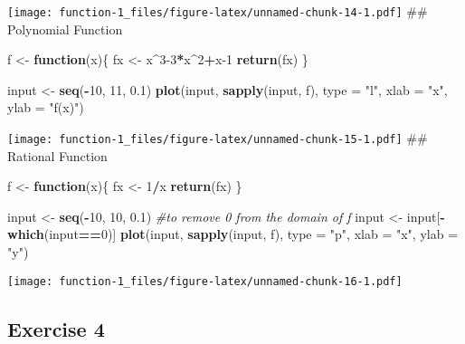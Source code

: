\documentclass[
]{article}
\newenvironment{Shaded}{\begin{snugshade}}{\end{snugshade}}
\newcommand{\CommentTok}[1]{\textcolor[rgb]{0.56,0.35,0.01}{\textit{#1}}}
\newcommand{\ControlFlowTok}[1]{\textcolor[rgb]{0.13,0.29,0.53}{\textbf{#1}}}
\newcommand{\DataTypeTok}[1]{\textcolor[rgb]{0.13,0.29,0.53}{#1}}
\newcommand{\DecValTok}[1]{\textcolor[rgb]{0.00,0.00,0.81}{#1}}
\newcommand{\FloatTok}[1]{\textcolor[rgb]{0.00,0.00,0.81}{#1}}
\newcommand{\KeywordTok}[1]{\textcolor[rgb]{0.13,0.29,0.53}{\textbf{#1}}}
\newcommand{\NormalTok}[1]{#1}
\newcommand{\OperatorTok}[1]{\textcolor[rgb]{0.81,0.36,0.00}{\textbf{#1}}}
\newcommand{\StringTok}[1]{\textcolor[rgb]{0.31,0.60,0.02}{#1}}
\begin{document}
\texttt{[image: function-1\_files/figure-latex/unnamed-chunk-14-1.pdf]}
\#\# Polynomial Function

\begin{Shaded}
\begin{Highlighting}[]
\NormalTok{f <-}\StringTok{ }\ControlFlowTok{function}\NormalTok{(x)\{}
\NormalTok{  fx <-}\StringTok{ }\NormalTok{x}\OperatorTok{^}\DecValTok{3-3}\OperatorTok{*}\NormalTok{x}\OperatorTok{^}\DecValTok{2}\OperatorTok{+}\NormalTok{x}\DecValTok{-1}
  \KeywordTok{return}\NormalTok{(fx)}
\NormalTok{\}}

\NormalTok{input <-}\StringTok{ }\KeywordTok{seq}\NormalTok{(}\OperatorTok{-}\DecValTok{10}\NormalTok{, }\DecValTok{11}\NormalTok{, }\FloatTok{0.1}\NormalTok{)}
\KeywordTok{plot}\NormalTok{(input, }\KeywordTok{sapply}\NormalTok{(input, f), }\DataTypeTok{type =} \StringTok{"l"}\NormalTok{, }\DataTypeTok{xlab =} \StringTok{"x"}\NormalTok{, }\DataTypeTok{ylab =} \StringTok{"f(x)"}\NormalTok{)}
\end{Highlighting}
\end{Shaded}

\texttt{[image: function-1\_files/figure-latex/unnamed-chunk-15-1.pdf]}
\#\# Rational Function

\begin{Shaded}
\begin{Highlighting}[]
\NormalTok{f <-}\StringTok{ }\ControlFlowTok{function}\NormalTok{(x)\{}
\NormalTok{  fx <-}\StringTok{ }\DecValTok{1}\OperatorTok{/}\NormalTok{x}
  \KeywordTok{return}\NormalTok{(fx)}
\NormalTok{\}}

\NormalTok{input <-}\StringTok{ }\KeywordTok{seq}\NormalTok{(}\OperatorTok{-}\DecValTok{10}\NormalTok{, }\DecValTok{10}\NormalTok{, }\FloatTok{0.1}\NormalTok{)}
\CommentTok{#to remove 0 from the domain of f}
\NormalTok{input <-}\StringTok{ }\NormalTok{input[}\OperatorTok{-}\KeywordTok{which}\NormalTok{(input}\OperatorTok{==}\DecValTok{0}\NormalTok{)]}
\KeywordTok{plot}\NormalTok{(input, }\KeywordTok{sapply}\NormalTok{(input, f), }\DataTypeTok{type =} \StringTok{"p"}\NormalTok{, }\DataTypeTok{xlab =} \StringTok{"x"}\NormalTok{, }\DataTypeTok{ylab =} \StringTok{"y"}\NormalTok{)}
\end{Highlighting}
\end{Shaded}

\texttt{[image: function-1\_files/figure-latex/unnamed-chunk-16-1.pdf]}

\hypertarget{exercise-4}{%
\subsection{Exercise 4}\label{exercise-4}}
\end{document}
